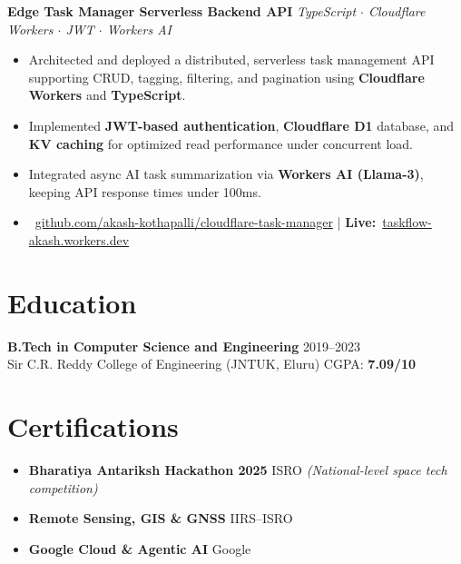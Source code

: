 \documentclass[a4paper,10pt]{article}
\newcommand{\iconbadge}[1]{%
  \tikz[baseline=-0.55ex]{\node[circle,fill=myblue,text=white,font=\bfseries\fontsize{5}{5}\selectfont,inner sep=1.3pt,minimum size=10pt]{#1};}%
}
\newcommand{\projectHeading}[2]{
  \vspace{0.08cm}\noindent\textbf{#1} \hfill \textit{#2}\par\vspace{0.03cm}
}
\begin{document}
\projectHeading{Edge Task Manager \textemdash{} Serverless Backend API}{TypeScript $\cdot$ Cloudflare Workers $\cdot$ JWT $\cdot$ Workers AI}
\begin{itemize}
\item Architected and deployed a distributed, serverless task management API supporting CRUD, tagging, filtering, and pagination using \textbf{Cloudflare Workers} and \textbf{TypeScript}.
\item Implemented \textbf{JWT-based authentication}, \textbf{Cloudflare D1} database, and \textbf{KV caching} for optimized read performance under concurrent load.
\item Integrated async AI task summarization via \textbf{Workers AI (Llama-3)}, keeping API response times under 100ms.
\item \iconbadge{gh}~\href{https://github.com/akash-kothapalli/cloudflare-task-manager}{github.com/akash-kothapalli/cloudflare-task-manager}
  \enspace\textcolor{myblue}{|}\enspace
  \textbf{Live:}~\href{https://cloudflare-task-manager.taskflow-akash.workers.dev}{taskflow-akash.workers.dev}
\end{itemize}

\section*{Education}
\textbf{B.Tech in Computer Science and Engineering} \hfill 2019--2023\\
Sir C.R. Reddy College of Engineering (JNTUK, Eluru) \hfill CGPA: \textbf{7.09/10}

\section*{Certifications}
\begin{itemize}
\item \textbf{Bharatiya Antariksh Hackathon 2025} \textemdash{} ISRO \textit{(National-level space tech competition)}
\item \textbf{Remote Sensing, GIS \& GNSS} \textemdash{} IIRS--ISRO
\item \textbf{Google Cloud \& Agentic AI} \textemdash{} Google
\end{itemize}
\end{document}
